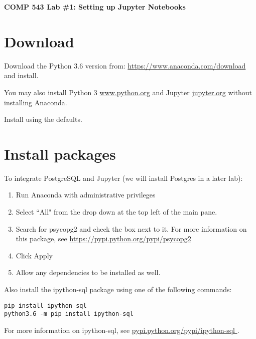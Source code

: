\documentclass[11pt]{article}
\renewcommand\:{\colon} %
\begin{document}

\begin{center}
{\bf \huge{COMP 543 Lab \#1: Setting up Jupyter Notebooks}}
\end{center}


\section{Download}
\noindent Download the Python 3.6 version from:
\url{https://www.anaconda.com/download} and install.
\vspace{1em}

\noindent You may also install Python 3 \url{www.python.org} and Jupyter \url{jupyter.org} without installing Anaconda.
\vspace{1em}


\noindent Install using the defaults.

\vspace{1em}

\section{Install packages}
\noindent To integrate PostgreSQL and Jupyter (we will install Postgres in a later lab):
\begin{enumerate}
\item Run Anaconda with administrative privileges
\item Select ``All" from the drop down at the top left of the main pane.
\item Search for psycopg2 and check the box next to it. 
\noindent For more information on this package, see \url{ https://pypi.python.org/pypi/psycopg2 }
\item Click Apply
\item Allow any dependencies to be installed as well.
\end{enumerate}

Also install the ipython-sql package using one of the following commands:
\begin{verbatim}
pip install ipython-sql
python3.6 -m pip install ipython-sql
\end{verbatim}

\noindent For more information on ipython-sql, see \url{pypi.python.org/pypi/ipython-sql }.
\end{document}
